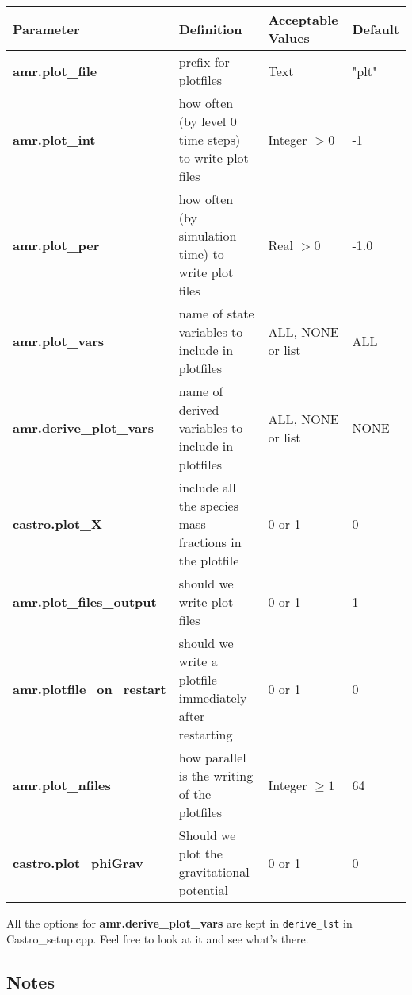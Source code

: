 \begin{table*}[h]
\begin{scriptsize}
\begin{center}
\begin{tabular}{|l|l|l|l|} \hline
Parameter & Definition & Acceptable Values &Default\\
\hline
{\bf amr.plot\_file} & prefix for plotfiles & Text & "plt" \\
{\bf amr.plot\_int}  & how often (by level 0 time steps) to write plot files & Integer $> 0$ & -1  \\
{\bf amr.plot\_per}  & how often (by simulation time) to write plot files & Real $> 0$ & -1.0 \\
{\bf amr.plot\_vars}  & name of state variables to include in plotfiles 
 & ALL, NONE or list & ALL \\
{\bf amr.derive\_plot\_vars}  & name of derived variables to include in plotfiles 
 & ALL, NONE or list & NONE \\
{\bf castro.plot\_X}  & include all the species mass fractions in the plotfile 
 & 0 or 1 & 0 \\
{\bf amr.plot\_files\_output} & should we write plot files & 0 or 1 & 1 \\
{\bf amr.plotfile\_on\_restart} & should we write a plotfile immediately after restarting 
  & 0 or 1 & 0 \\
{\bf amr.plot\_nfiles}  & how parallel is the writing of the plotfiles & Integer $\geq 1$ & 64 \\
{\bf castro.plot\_phiGrav} & Should we plot the gravitational potential & 0 or 1 & 0 \\
\hline
\end{tabular}
\end{center}
\end{scriptsize}
\end{table*}

All the options for {\bf amr.derive\_plot\_vars} are kept in \texttt{derive\_lst} in Castro\_setup.cpp.  Feel free to look at it and see what's there. 


\subsection{Notes}

